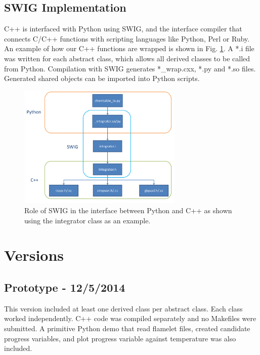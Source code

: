 \documentclass[11pt]{article}
\begin{document}
\subsection{SWIG Implementation}
C++ is interfaced with Python using SWIG, and the interface compiler
that connects C/C++ functions with scripting languages like Python,
Perl or Ruby. An example of how our C++ functions are wrapped is shown
in Fig.  \ref{fig:swig}. A *.i file was written for each abstract
class, which allows all derived classes to be called from Python. 
Compilation with SWIG generates *\_wrap.cxx, *.py and *.so
files. Generated shared objects can be imported into Python scripts.

\begin{figure} [h]
\centering
\includegraphics[width=0.7\textwidth]{python_swig_c++}
\caption{\label{fig:swig} Role of SWIG in the interface between Python
  and C++ as shown using the integrator class as an example.}
\end{figure}


\section{Versions}

\subsection{Prototype - 12/5/2014}
This version included at least one derived class per abstract
class. Each class worked independently. C++ code was compiled
separately and no Makefiles were submitted. A primitive Python demo
that read flamelet files, created candidate progress variables, and
plot progress variable against temperature was also included.
\\
\end{document}

